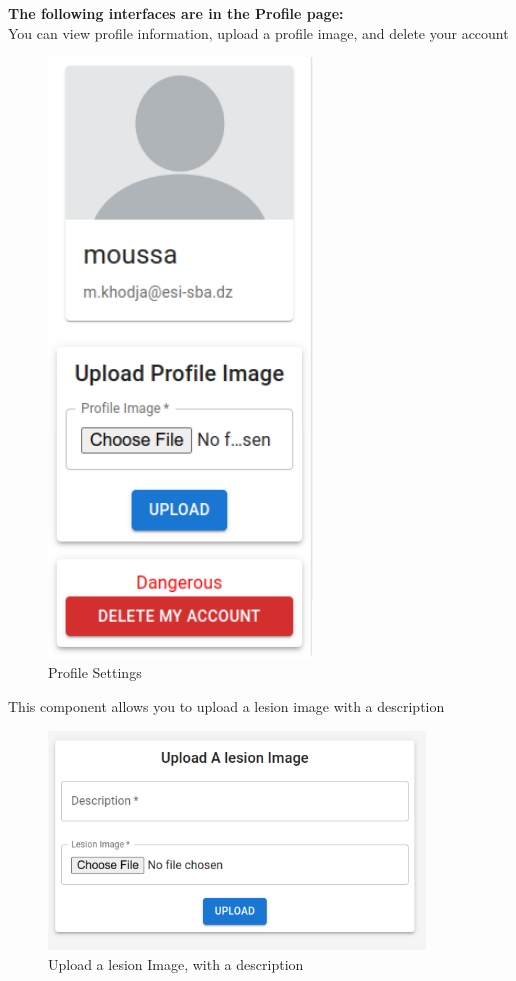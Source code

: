         
        \noindent \textbf{The following interfaces are in the Profile page:} \\
        \noindent You can view profile information, upload a profile image, and delete your account 
        \begin{figure}[H]
        \begin{center}
        \includegraphics[width=7cm]{./diagnosis-system/presentation-of-app/profile-settings.png}
        \end{center}
        \caption{Profile Settings}
        \label{fig:}
        \end{figure}

        
        \noindent This component allows you to upload a lesion image with a description 
        \begin{figure}[H]
        \begin{center}
        \includegraphics[width=10cm]{./diagnosis-system/presentation-of-app/upload-lesion.png}
        \end{center}
        \caption{Upload a lesion Image, with a description}
        \label{fig:}
        \end{figure}

